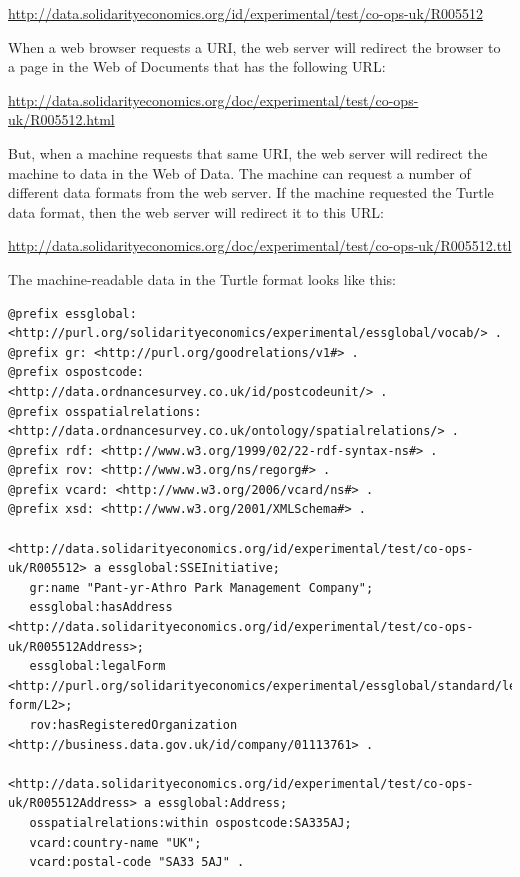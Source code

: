 {\footnotesize \url{http://data.solidarityeconomics.org/id/experimental/test/co-ops-uk/R005512}}

\geek When a web browser requests a URI, the web server will redirect the browser to a page in the Web of Documents that has the following URL:

{\footnotesize \url{http://data.solidarityeconomics.org/doc/experimental/test/co-ops-uk/R005512.html}}

\geek But, when a machine requests that same URI, the web server will redirect the machine to data in the Web of Data. 
The machine can request a number of different data formats from the web server.
If the machine requested the Turtle data format, then the web server will redirect it to this URL:

{\footnotesize \url{http://data.solidarityeconomics.org/doc/experimental/test/co-ops-uk/R005512.ttl}}

\geek The machine-readable data in the Turtle format looks like this:

{\footnotesize
\begin{verbatim}
@prefix essglobal: <http://purl.org/solidarityeconomics/experimental/essglobal/vocab/> .
@prefix gr: <http://purl.org/goodrelations/v1#> .
@prefix ospostcode: <http://data.ordnancesurvey.co.uk/id/postcodeunit/> .
@prefix osspatialrelations: <http://data.ordnancesurvey.co.uk/ontology/spatialrelations/> .
@prefix rdf: <http://www.w3.org/1999/02/22-rdf-syntax-ns#> .
@prefix rov: <http://www.w3.org/ns/regorg#> .
@prefix vcard: <http://www.w3.org/2006/vcard/ns#> .
@prefix xsd: <http://www.w3.org/2001/XMLSchema#> .

<http://data.solidarityeconomics.org/id/experimental/test/co-ops-uk/R005512> a essglobal:SSEInitiative;
   gr:name "Pant-yr-Athro Park Management Company";
   essglobal:hasAddress <http://data.solidarityeconomics.org/id/experimental/test/co-ops-uk/R005512Address>;
   essglobal:legalForm <http://purl.org/solidarityeconomics/experimental/essglobal/standard/legal-form/L2>;
   rov:hasRegisteredOrganization <http://business.data.gov.uk/id/company/01113761> .

<http://data.solidarityeconomics.org/id/experimental/test/co-ops-uk/R005512Address> a essglobal:Address;
   osspatialrelations:within ospostcode:SA335AJ;
   vcard:country-name "UK";
   vcard:postal-code "SA33 5AJ" .
\end{verbatim}
}

